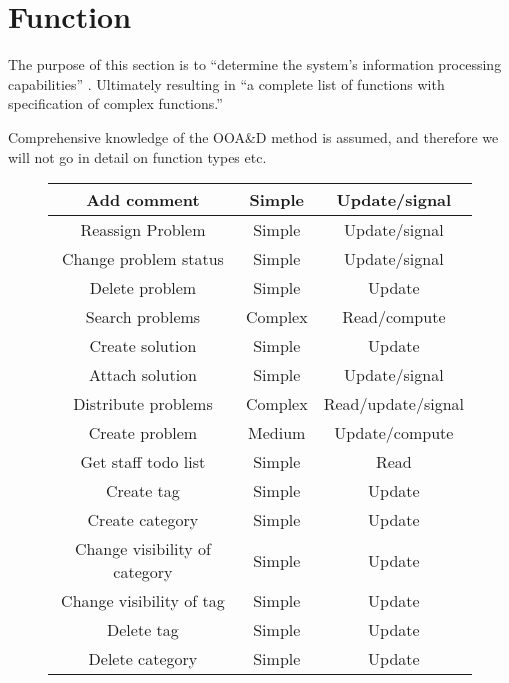 \section{Function}
\label{sec:function}

The purpose of this section is to ``determine the system's information processing capabilities'' \cite[p.~137]{roedeaalborg}. Ultimately resulting in ``a complete list of functions with specification of complex functions.'' \cite[p.~137]{roedeaalborg}

Comprehensive knowledge of the OOA\&D method is assumed, and therefore we will not go in detail on function types etc. 

\begin{figure}[h] %
\begin{center}
\begin{tabular}{|c|c|c|}
\hline
Add comment &   Simple & Update/signal   \\ \hline%
Reassign Problem & Simple   & Update/signal \\ \hline%
Change problem status &   Simple & Update/signal \\ \hline%
Delete problem & Simple &   Update \\   \hline%
Search problems & Complex &   Read/compute \\ \hline%
Create solution & Simple &   Update \\   \hline%
Attach solution & Simple &   Update/signal \\   \hline%
Distribute problems &   Complex & Read/update/signal \\   \hline%
Create problem & Medium & Update/compute \\   \hline%
Get staff todo list & Simple & Read \\   \hline%
Create tag & Simple &   Update \\ \hline%
Create category & Simple & Update \\ \hline%
Change visibility of category &   Simple &   Update \\   \hline%
Change visibility of tag &   Simple &  Update \\ \hline%
Delete tag & Simple &   Update \\ \hline%
Delete category & Simple & Update \\ \hline%

\end{tabular}
\end{center}
\end{figure}
